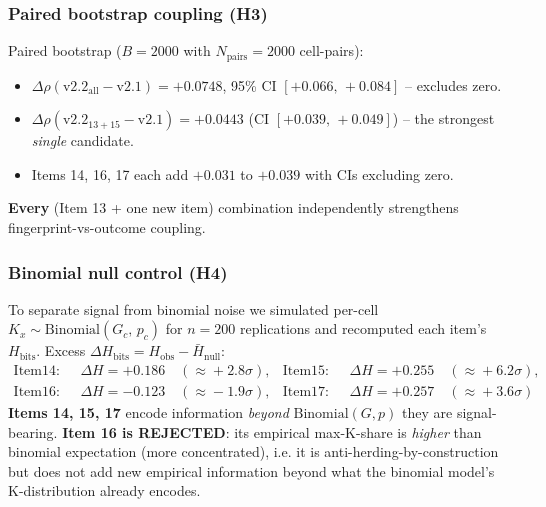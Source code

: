 \documentclass{article}  \usepackage[preprint,nonatbib]{neurips_2026} \usepackage[numbers]{natbib}
\begin{document}
\subsubsection{Paired bootstrap coupling (H3)}
Paired bootstrap ($B=2000$ with $N_{\mathrm{pairs}}=2000$ cell-pairs):
\begin{itemize}
  \item $\Delta\rho(\mathrm{v2.2}_{\mathrm{all}} - \mathrm{v2.1}) = \mathbf{+0.0748}$, 95\% CI $[\mathbf{+0.066,\,+0.084}]$ -- excludes zero.
  \item $\Delta\rho(\mathrm{v2.2}_{13+15} - \mathrm{v2.1}) = +0.0443$ (CI $[+0.039,\,+0.049]$) -- the strongest \emph{single} candidate.
  \item Items 14, 16, 17 each add $+0.031$ to $+0.039$ with CIs excluding zero.
\end{itemize}
\textbf{Every} (Item 13 + one new item) combination independently strengthens
fingerprint-vs-outcome coupling.

\subsubsection{Binomial null control (H4)}
To separate signal from binomial noise we simulated per-cell
$K_x \sim \mathrm{Binomial}(G_c,\, p_c)$ for $n=200$ replications and
recomputed each item's $H_{\mathrm{bits}}$. Excess
$\Delta H_{\mathrm{bits}} = H_{\mathrm{obs}} - \bar H_{\mathrm{null}}$:
\begin{align}
  \mathrm{Item14:}\;&\ \Delta H = +0.186\quad(\!\approx\!+2.8\sigma), &
  \mathrm{Item15:}\;&\ \Delta H = +0.255\quad(\!\approx\!+6.2\sigma), \\
  \mathrm{Item16:}\;&\ \Delta H = -0.123\quad(\!\approx\!-1.9\sigma), &
  \mathrm{Item17:}\;&\ \Delta H = +0.257\quad(\!\approx\!+3.6\sigma)
  \label{eq:null_excess}
\end{align}
\textbf{Items 14, 15, 17} encode information \emph{beyond} $\mathrm{Binomial}(G,p)$
they are signal-bearing. \textbf{Item 16 is REJECTED}: its empirical
max-K-share is \emph{higher} than binomial expectation (more concentrated),
i.e. it is anti-herding-by-construction but does not add new empirical
information beyond what the binomial model's K-distribution already encodes.
\end{document}
